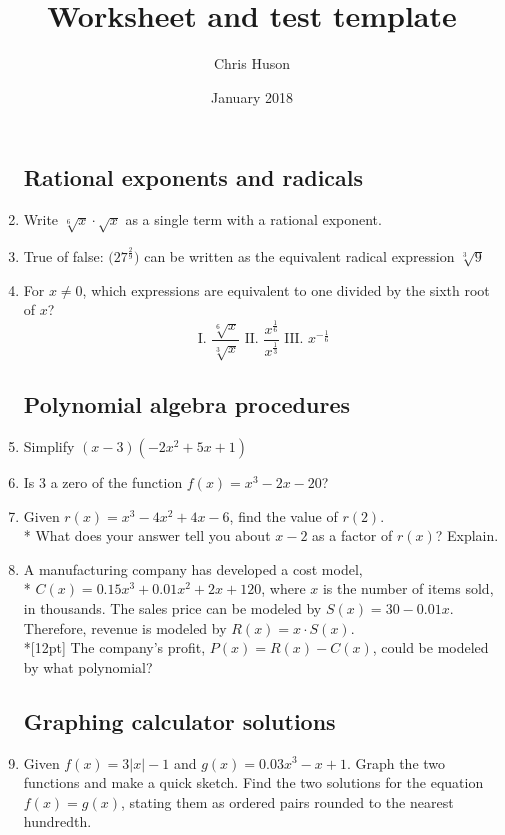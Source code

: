 \documentclass[12pt, oneside]{article}
\title{Worksheet and test template}
\author{Chris Huson}
\date{January 2018}
\begin{document}
\begin{enumerate}
\subsection*{Rational exponents and radicals}

\item Write $\sqrt[6]{x} \cdot \sqrt{x}$ as a single term with a rational exponent.

\item True of false:  $\displaystyle \big( 27^\frac{2}{9} \big) $ can be written as the equivalent radical expression $\sqrt[3]9$

\item For $x \neq 0$, which expressions are equivalent to one divided by the sixth root of $x$?
\[ \text{I. } \frac{\sqrt[6]{x}}{\sqrt[3]{x}} \text{  II. } \frac{x^{\frac{1}{6}}}{x^{\frac{1}{3}}} \text{  III. } x^{-\frac{1}{6}} \]

\subsection*{Polynomial algebra procedures}
\item Simplify $(x-3)(-2x^2+5x+1)$
\item Is 3 a zero of the function $f(x)=x^3-2x-20$?

\item Given $r(x)=x^3-4x^2+4x-6$, find the value of $r(2)$.\\*
What does your answer tell you about $x-2$ as a factor of $r(x)$? Explain.

\item A manufacturing company has developed a cost model,\\* $C(x)=0.15x^3 +0.01x^2+2x+120$, where $x$ is the number of items sold, in thousands. The sales price can be modeled by $S(x)=30-0.01x$. Therefore, revenue is modeled by $R(x)=x \cdot S(x)$.\\*[12pt]
The company’s profit, $P(x)=R(x)-C(x)$, could be modeled by what polynomial?

\subsection*{Graphing calculator solutions}
\item Given $f(x) = 3|x|-1$ and $g(x)=0.03x^3-x+1$. Graph the two functions and make a quick sketch. Find the two solutions for the equation $f(x)=g(x)$, stating them as ordered pairs rounded to the nearest hundredth.


\end{enumerate}
\end{document}
